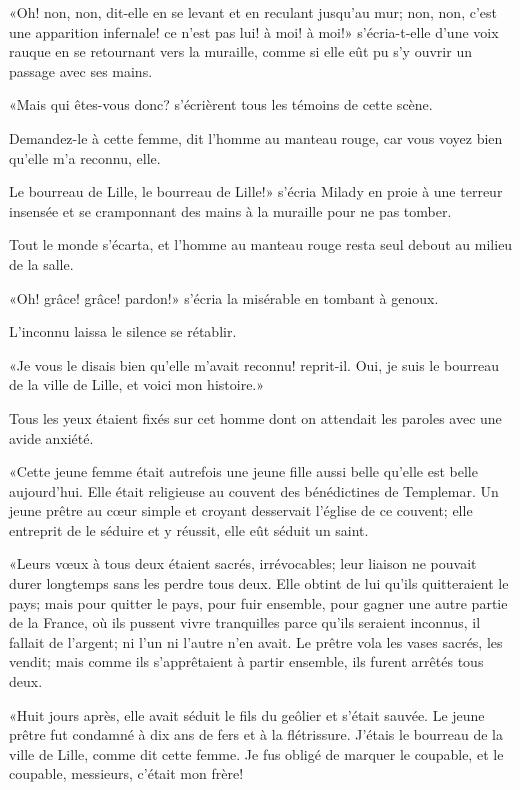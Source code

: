 «Oh! non, non, dit-elle en se levant et en reculant jusqu'au mur; non, non, c'est une apparition infernale! ce n'est pas lui! à moi! à moi!» s'écria-t-elle d'une voix rauque en se retournant vers la muraille, comme si elle eût pu s'y ouvrir un passage avec ses mains. 

«Mais qui êtes-vous donc? s'écrièrent tous les témoins de cette scène. 

\speak  Demandez-le à cette femme, dit l'homme au manteau rouge, car vous voyez bien qu'elle m'a reconnu, elle. 

\speak  Le bourreau de Lille, le bourreau de Lille!» s'écria Milady en proie à une terreur insensée et se cramponnant des mains à la muraille pour ne pas tomber. 

Tout le monde s'écarta, et l'homme au manteau rouge resta seul debout au milieu de la salle. 

«Oh! grâce! grâce! pardon!» s'écria la misérable en tombant à genoux. 

L'inconnu laissa le silence se rétablir. 

«Je vous le disais bien qu'elle m'avait reconnu! reprit-il. Oui, je suis le bourreau de la ville de Lille, et voici mon histoire.» 

Tous les yeux étaient fixés sur cet homme dont on attendait les paroles avec une avide anxiété. 

«Cette jeune femme était autrefois une jeune fille aussi belle qu'elle est belle aujourd'hui. Elle était religieuse au couvent des bénédictines de Templemar. Un jeune prêtre au cœur simple et croyant desservait l'église de ce couvent; elle entreprit de le séduire et y réussit, elle eût séduit un saint. 

«Leurs vœux à tous deux étaient sacrés, irrévocables; leur liaison ne pouvait durer longtemps sans les perdre tous deux. Elle obtint de lui qu'ils quitteraient le pays; mais pour quitter le pays, pour fuir ensemble, pour gagner une autre partie de la France, où ils pussent vivre tranquilles parce qu'ils seraient inconnus, il fallait de l'argent; ni l'un ni l'autre n'en avait. Le prêtre vola les vases sacrés, les vendit; mais comme ils s'apprêtaient à partir ensemble, ils furent arrêtés tous deux. 

«Huit jours après, elle avait séduit le fils du geôlier et s'était sauvée. Le jeune prêtre fut condamné à dix ans de fers et à la flétrissure. J'étais le bourreau de la ville de Lille, comme dit cette femme. Je fus obligé de marquer le coupable, et le coupable, messieurs, c'était mon frère! 


